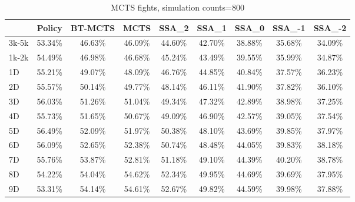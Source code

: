 \begin{table}[htbp]
    \centering
    \begin{tabular}{lcccccccc}
        \toprule
        & Policy & BT-MCTS & MCTS & SSA\_2 & SSA\_1 & SSA\_0 & SSA\_-1 & SSA\_-2 \\
        \midrule
        3k-5k & 53.34\% & 46.63\% & 46.09\% & 44.60\% & 42.70\% & 38.88\% & 35.68\% & 34.09\% \\
        1k-2k & 54.49\% & 46.98\% & 46.68\% & 45.24\% & 43.49\% & 39.55\% & 35.99\% & 34.87\% \\
        1D & 55.21\% & 49.07\% & 48.09\% & 46.76\% & 44.85\% & 40.84\% & 37.57\% & 36.23\% \\
        2D & 55.57\% & 50.14\% & 49.77\% & 48.14\% & 46.11\% & 41.90\% & 37.82\% & 36.10\% \\
        3D & 56.03\% & 51.26\% & 51.04\% & 49.34\% & 47.32\% & 42.89\% & 38.98\% & 37.25\% \\
        4D & 55.73\% & 51.65\% & 50.67\% & 49.09\% & 46.90\% & 42.57\% & 39.05\% & 37.54\% \\
        5D & 56.49\% & 52.09\% & 51.97\% & 50.38\% & 48.10\% & 43.69\% & 39.85\% & 37.97\% \\
        6D & 56.09\% & 52.65\% & 52.38\% & 50.74\% & 48.48\% & 44.05\% & 39.83\% & 38.18\% \\
        7D & 55.76\% & 53.87\% & 52.81\% & 51.18\% & 49.10\% & 44.39\% & 40.20\% & 38.78\% \\
        8D & 54.22\% & 54.04\% & 54.62\% & 52.34\% & 49.95\% & 44.69\% & 39.69\% & 37.95\% \\
        9D & 53.31\% & 54.14\% & 54.61\% & 52.67\% & 49.82\% & 44.59\% & 39.98\% & 37.88\% \\
        \bottomrule
    \end{tabular}
    \caption{MCTS fights, simulation counts=800}
\end{table}